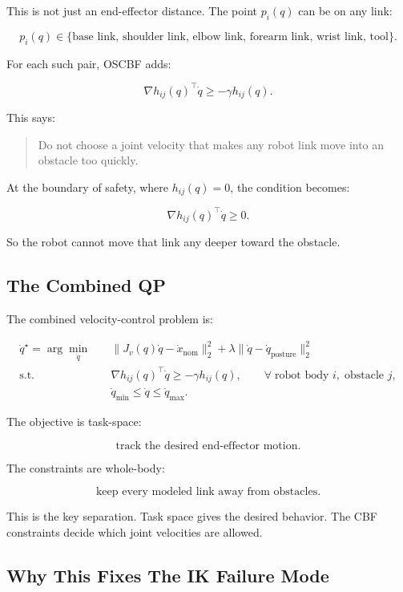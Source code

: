 \documentclass[11pt]{article}
\begin{document}
This is not just an end-effector distance. The point $p_i(q)$ can be on any
link:

\[
p_i(q) \in
\{\text{base link, shoulder link, elbow link, forearm link, wrist link, tool}\}.
\]

For each such pair, OSCBF adds:

\[
\nabla h_{ij}(q)^\top \dot{q}
\ge
-\gamma h_{ij}(q).
\]

This says:

\begin{quote}
Do not choose a joint velocity that makes any robot link move into an obstacle
too quickly.
\end{quote}

At the boundary of safety, where $h_{ij}(q)=0$, the condition becomes:

\[
\nabla h_{ij}(q)^\top \dot{q} \ge 0.
\]

So the robot cannot move that link any deeper toward the obstacle.

\subsection{The Combined QP}

The combined velocity-control problem is:

\[
\begin{aligned}
\dot{q}^{\star}
= \arg\min_{\dot{q}} \quad
& \|J_v(q)\dot{q} - \dot{x}_{\mathrm{nom}}\|_2^2
 + \lambda \|\dot{q} - \dot{q}_{\mathrm{posture}}\|_2^2 \\
\text{s.t.} \quad
& \nabla h_{ij}(q)^\top \dot{q}
  \ge -\gamma h_{ij}(q),
  \qquad \forall\; \text{robot body } i,\; \text{obstacle } j,\\
& \dot{q}_{\min} \le \dot{q} \le \dot{q}_{\max}.
\end{aligned}
\]

The objective is task-space:

\[
\text{track the desired end-effector motion}.
\]

The constraints are whole-body:

\[
\text{keep every modeled link away from obstacles}.
\]

This is the key separation. Task space gives the desired behavior. The CBF
constraints decide which joint velocities are allowed.

\subsection{Why This Fixes The IK Failure Mode}
\end{document}
